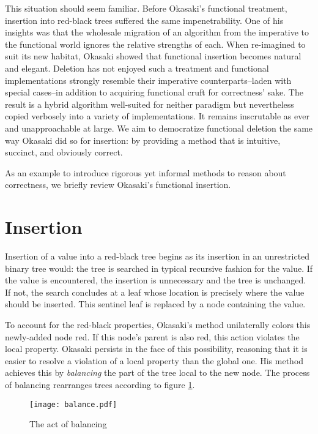 \documentclass[preprint]{sigplanconf}
\begin{document}
This situation should seem familiar. Before Okasaki's functional treatment,
insertion into red-black trees suffered the same impenetrability. One of his
insights was that the wholesale migration of an algorithm from the imperative to
the functional world ignores the relative strengths of each. When re-imagined to
suit its new habitat, Okasaki showed that functional insertion becomes natural
and elegant. Deletion has not enjoyed such a treatment and functional
implementations strongly resemble their imperative counterparts--laden with
special cases--in addition to acquiring functional cruft for correctness' sake.
The result is a hybrid algorithm well-suited for neither paradigm but
nevertheless copied verbosely into a variety of implementations. It remains
inscrutable as ever and unapproachable at large. We aim to democratize
functional deletion the same way Okasaki did so for insertion: by providing a
method that is intuitive, succinct, and obviously correct.

As an example to introduce rigorous yet informal methods to reason about
correctness, we briefly review Okasaki's functional insertion.

\section{Insertion}

Insertion of a value into a red-black tree begins as its insertion in an
unrestricted binary tree would: the tree is searched in typical recursive
fashion for the value. If the value is encountered, the insertion is unnecessary
and the tree is unchanged. If not, the search concludes at a leaf whose location
is precisely where the value should be inserted. This sentinel leaf is replaced
by a node containing the value.

To account for the red-black properties, Okasaki's method unilaterally colors
this newly-added node red. If this node's parent is also red, this action
violates the local property. Okasaki persists in the face of this possibility,
reasoning that it is easier to resolve a violation of a local property than the
global one. His method achieves this by \emph{balancing} the part of the tree
local to the new node. The process of balancing rearranges trees according to
figure \ref{fig:balance}.

\begin{figure}
\label{fig:balance}
\begin{center}
\texttt{[image: balance.pdf]}
\end{center}
\caption{The act of balancing}
\end{figure}
\end{document}
